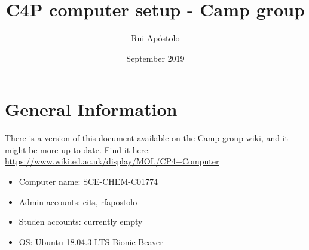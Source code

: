 \documentclass{article}
\title{C4P computer setup - Camp group}
\author{Rui Apóstolo}
\date{September 2019}
\begin{document}
\maketitle

\section*{General Information}

There is a version of this document available on the Camp group wiki, and it might be more up to date. Find it here: \url{https://www.wiki.ed.ac.uk/display/MOL/CP4+Computer}

\begin{itemize}
    \item Computer name: SCE-CHEM-C01774
    \item Admin accounts: cits, rfapostolo
    \item Studen accounts: currently empty
    \item OS: Ubuntu 18.04.3 LTS Bionic Beaver
\end{itemize}
\end{document}
